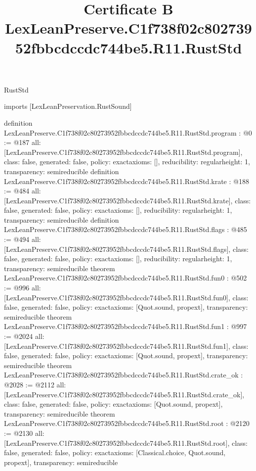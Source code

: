 \begin{lexlean}{RustStd}
\title{Certificate B LexLeanPreserve.C1f738f02c80273952fbbcdccdc744be5.R11.RustStd}
\begin{coremodule}
imports [LexLeanPreservation.RustSound]

definition LexLeanPreserve.C1f738f02c80273952fbbcdccdc744be5.R11.RustStd.program : @0 := @187 {
  all: [LexLeanPreserve.C1f738f02c80273952fbbcdccdc744be5.R11.RustStd.program],
  class: false,
  generated: false,
  policy: exact{axioms: []},
  reducibility: regular{height: 1},
  transparency: semireducible
}
definition LexLeanPreserve.C1f738f02c80273952fbbcdccdc744be5.R11.RustStd.krate : @188 := @484 {
  all: [LexLeanPreserve.C1f738f02c80273952fbbcdccdc744be5.R11.RustStd.krate],
  class: false,
  generated: false,
  policy: exact{axioms: []},
  reducibility: regular{height: 1},
  transparency: semireducible
}
definition LexLeanPreserve.C1f738f02c80273952fbbcdccdc744be5.R11.RustStd.flags : @485 := @494 {
  all: [LexLeanPreserve.C1f738f02c80273952fbbcdccdc744be5.R11.RustStd.flags],
  class: false,
  generated: false,
  policy: exact{axioms: []},
  reducibility: regular{height: 1},
  transparency: semireducible
}
theorem LexLeanPreserve.C1f738f02c80273952fbbcdccdc744be5.R11.RustStd.fun0 : @502 := @996 {
  all: [LexLeanPreserve.C1f738f02c80273952fbbcdccdc744be5.R11.RustStd.fun0],
  class: false,
  generated: false,
  policy: exact{axioms: [Quot.sound, propext]},
  transparency: semireducible
}
theorem LexLeanPreserve.C1f738f02c80273952fbbcdccdc744be5.R11.RustStd.fun1 : @997 := @2024 {
  all: [LexLeanPreserve.C1f738f02c80273952fbbcdccdc744be5.R11.RustStd.fun1],
  class: false,
  generated: false,
  policy: exact{axioms: [Quot.sound, propext]},
  transparency: semireducible
}
theorem LexLeanPreserve.C1f738f02c80273952fbbcdccdc744be5.R11.RustStd.crate_ok : @2028 := @2112 {
  all: [LexLeanPreserve.C1f738f02c80273952fbbcdccdc744be5.R11.RustStd.crate_ok],
  class: false,
  generated: false,
  policy: exact{axioms: [Quot.sound, propext]},
  transparency: semireducible
}
theorem LexLeanPreserve.C1f738f02c80273952fbbcdccdc744be5.R11.RustStd.root : @2120 := @2130 {
  all: [LexLeanPreserve.C1f738f02c80273952fbbcdccdc744be5.R11.RustStd.root],
  class: false,
  generated: false,
  policy: exact{axioms: [Classical.choice, Quot.sound, propext]},
  transparency: semireducible
}


\end{coremodule}
\end{lexlean}
